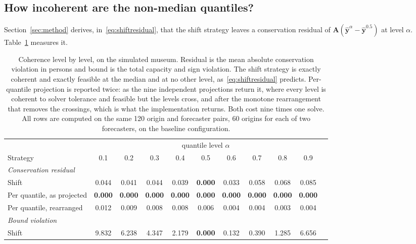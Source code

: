 \documentclass[utf8]{FrontiersinHarvard}
\newif\ifrevisionmarkup
\newcommand{\new}[1]{\ifrevisionmarkup\textcolor{revision}{#1}\else#1\fi}
\newif\ifsecondrevisionmarkup
\newcommand{\rev}[1]{\ifsecondrevisionmarkup\textcolor{revisiontwo}{#1}\else#1\fi}
\theoremstyle{plain}
\theoremstyle{definition}
\theoremstyle{remark}
\newcommand{\bA}{\bm{A}}
\newcommand{\by}{\bm{y}}
\newcommand{\yhat}{\hat{\by}}
\newcommand{\best}[1]{\textbf{#1}}
\begin{document}
\subsection{\new{How incoherent are the non-median quantiles?}}
\label{sec:quantcoh}

\new{Section~\ref{sec:method} derives, in~\eqref{eq:shiftresidual}, that the shift strategy leaves a conservation residual of $\bA(\yhat^{\alpha}-\yhat^{0.5})$ at level $\alpha$. Table~\ref{tab:quantcoh} measures it.}

\new{\begin{table}[htbp]
\centering
\caption{\new{Coherence level by level, on the simulated museum. Residual is the mean absolute conservation violation in persons and bound is the total capacity and sign violation. The shift strategy is exactly coherent and exactly feasible at the median and at no other level, as~\eqref{eq:shiftresidual} predicts. \rev{Per-quantile projection is reported twice: as the nine independent projections return it, where every level is coherent to solver tolerance and feasible but the levels cross, and after the monotone rearrangement that removes the crossings, which is what the implementation returns. Both cost nine times one solve. All rows are computed on the same \num{120} origin and forecaster pairs, \num{60} origins for each of two forecasters, on the baseline configuration.}}}
\label{tab:quantcoh}
\small
\begin{tabular}{lcccccccccc}
\toprule
& \multicolumn{9}{c}{quantile level $\alpha$} \\
\cmidrule(lr){2-10}
Strategy & 0.1 & 0.2 & 0.3 & 0.4 & 0.5 & 0.6 & 0.7 & 0.8 & 0.9 \\
\midrule
\multicolumn{10}{l}{\emph{Conservation residual}}\\
Shift        & 0.044 & 0.041 & 0.044 & 0.039 & \best{0.000} & 0.033 & 0.058 & 0.068 & 0.085 \\
\rev{Per quantile, as projected} & \rev{\best{0.000}} & \rev{\best{0.000}} & \rev{\best{0.000}} & \rev{\best{0.000}} & \rev{\best{0.000}} & \rev{\best{0.000}} & \rev{\best{0.000}} & \rev{\best{0.000}} & \rev{\best{0.000}} \\
\rev{Per quantile, rearranged} & 0.012 & 0.009 & 0.008 & 0.008 & 0.006 & 0.004 & 0.004 & 0.003 & 0.004 \\
\midrule
\multicolumn{10}{l}{\emph{Bound violation}}\\
Shift        & 9.832 & 6.238 & 4.347 & 2.179 & \best{0.000} & 0.132 & 0.390 & 1.285 & 6.656 \\

\end{tabular}
\end{table}}
\end{document}
